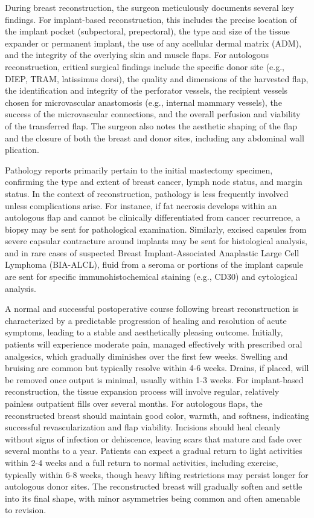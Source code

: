 During breast reconstruction, the surgeon meticulously documents several key findings. For implant-based reconstruction, this includes the precise location of the implant pocket (subpectoral, prepectoral), the type and size of the tissue expander or permanent implant, the use of any acellular dermal matrix (ADM), and the integrity of the overlying skin and muscle flaps. For autologous reconstruction, critical surgical findings include the specific donor site (e.g., DIEP, TRAM, latissimus dorsi), the quality and dimensions of the harvested flap, the identification and integrity of the perforator vessels, the recipient vessels chosen for microvascular anastomosis (e.g., internal mammary vessels), the success of the microvascular connections, and the overall perfusion and viability of the transferred flap. The surgeon also notes the aesthetic shaping of the flap and the closure of both the breast and donor sites, including any abdominal wall plication.

Pathology reports primarily pertain to the initial mastectomy specimen, confirming the type and extent of breast cancer, lymph node status, and margin status. In the context of reconstruction, pathology is less frequently involved unless complications arise. For instance, if fat necrosis develops within an autologous flap and cannot be clinically differentiated from cancer recurrence, a biopsy may be sent for pathological examination. Similarly, excised capsules from severe capsular contracture around implants may be sent for histological analysis, and in rare cases of suspected Breast Implant-Associated Anaplastic Large Cell Lymphoma (BIA-ALCL), fluid from a seroma or portions of the implant capsule are sent for specific immunohistochemical staining (e.g., CD30) and cytological analysis.

A normal and successful postoperative course following breast reconstruction is characterized by a predictable progression of healing and resolution of acute symptoms, leading to a stable and aesthetically pleasing outcome. Initially, patients will experience moderate pain, managed effectively with prescribed oral analgesics, which gradually diminishes over the first few weeks. Swelling and bruising are common but typically resolve within 4-6 weeks. Drains, if placed, will be removed once output is minimal, usually within 1-3 weeks. For implant-based reconstruction, the tissue expansion process will involve regular, relatively painless outpatient fills over several months. For autologous flaps, the reconstructed breast should maintain good color, warmth, and softness, indicating successful revascularization and flap viability. Incisions should heal cleanly without signs of infection or dehiscence, leaving scars that mature and fade over several months to a year. Patients can expect a gradual return to light activities within 2-4 weeks and a full return to normal activities, including exercise, typically within 6-8 weeks, though heavy lifting restrictions may persist longer for autologous donor sites. The reconstructed breast will gradually soften and settle into its final shape, with minor asymmetries being common and often amenable to revision.

